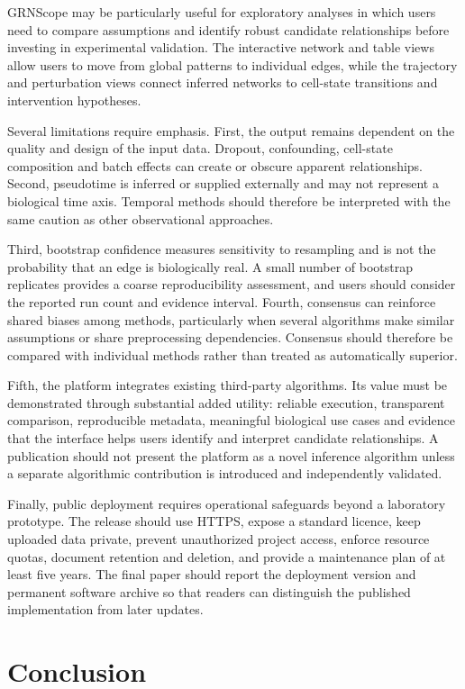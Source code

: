 \documentclass[unnumsec,webpdf,modern,large]{oup-authoring-template}%
\begin{document}
GRNScope may be particularly useful for exploratory analyses in which users need to compare assumptions and identify robust candidate relationships before investing in experimental validation. The interactive network and table views allow users to move from global patterns to individual edges, while the trajectory and perturbation views connect inferred networks to cell-state transitions and intervention hypotheses.

Several limitations require emphasis. First, the output remains dependent on the quality and design of the input data. Dropout, confounding, cell-state composition and batch effects can create or obscure apparent relationships. Second, pseudotime is inferred or supplied externally and may not represent a biological time axis. Temporal methods should therefore be interpreted with the same caution as other observational approaches.

Third, bootstrap confidence measures sensitivity to resampling and is not the probability that an edge is biologically real. A small number of bootstrap replicates provides a coarse reproducibility assessment, and users should consider the reported run count and evidence interval. Fourth, consensus can reinforce shared biases among methods, particularly when several algorithms make similar assumptions or share preprocessing dependencies. Consensus should therefore be compared with individual methods rather than treated as automatically superior.

Fifth, the platform integrates existing third-party algorithms. Its value must be demonstrated through substantial added utility: reliable execution, transparent comparison, reproducible metadata, meaningful biological use cases and evidence that the interface helps users identify and interpret candidate relationships. A publication should not present the platform as a novel inference algorithm unless a separate algorithmic contribution is introduced and independently validated.

Finally, public deployment requires operational safeguards beyond a laboratory prototype. The release should use HTTPS, expose a standard licence, keep uploaded data private, prevent unauthorized project access, enforce resource quotas, document retention and deletion, and provide a maintenance plan of at least five years. The final paper should report the deployment version and permanent software archive so that readers can distinguish the published implementation from later updates.

\section{Conclusion}
\end{document}
